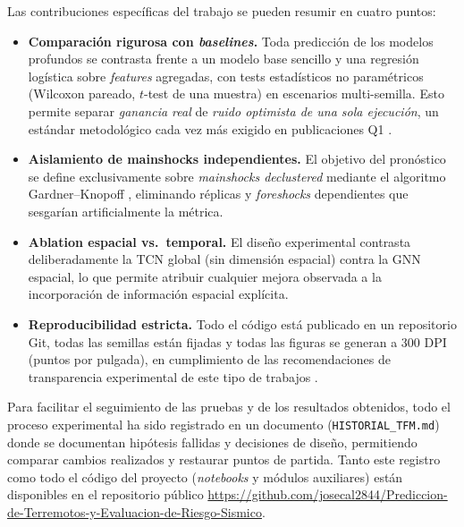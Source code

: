 Las contribuciones específicas del trabajo se pueden resumir en cuatro puntos:

\begin{itemize}
  \item \textbf{Comparación rigurosa con \textit{baselines}.} Toda predicción de los modelos profundos se contrasta frente a un modelo base sencillo y una regresión logística sobre \textit{features} agregadas, con tests estadísticos no paramétricos (Wilcoxon pareado, $t$-test de una muestra) en escenarios multi-semilla. Esto permite separar \emph{ganancia real} de \emph{ruido optimista de una sola ejecución}, un estándar metodológico cada vez más exigido en publicaciones Q1 \citep{beroza2021dlreview}.

  \item \textbf{Aislamiento de mainshocks independientes.} El objetivo del pronóstico se define exclusivamente sobre \emph{mainshocks declustered} mediante el algoritmo Gardner--Knopoff \citep{gardner1974poissonian, vanstiphout2012declustering}, eliminando réplicas y \emph{foreshocks} dependientes que sesgarían artificialmente la métrica.

  \item \textbf{Ablation espacial vs.\ temporal.} El diseño experimental contrasta deliberadamente la TCN global (sin dimensión espacial) contra la GNN espacial, lo que permite atribuir cualquier mejora observada a la incorporación de información espacial explícita.

  \item \textbf{Reproducibilidad estricta.} Todo el código está publicado en un repositorio Git, todas las semillas están fijadas y todas las figuras se generan a 300 DPI (puntos por pulgada), en cumplimiento de las recomendaciones de transparencia experimental de este tipo de trabajos \citep{reichstein2019deep, bergen2019sciencedata}.

\end{itemize}

Para facilitar el seguimiento de las pruebas y de los resultados obtenidos, todo el proceso experimental ha sido registrado en un documento (\texttt{HISTORIAL\_TFM.md}) donde se documentan hipótesis fallidas y decisiones de diseño, permitiendo comparar cambios realizados y restaurar puntos de partida. Tanto este registro como todo el código del proyecto (\textit{notebooks} y módulos auxiliares) están disponibles en el repositorio público \url{https://github.com/josecal2844/Prediccion-de-Terremotos-y-Evaluacion-de-Riesgo-Sismico}.


